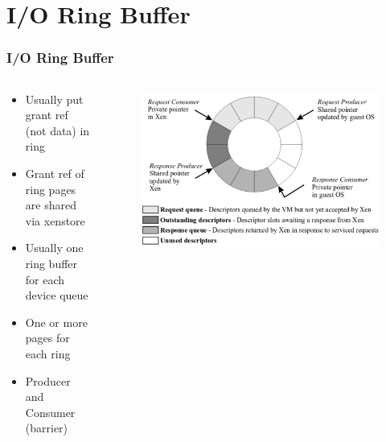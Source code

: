 \documentclass[aspectratio=169]{beamer}
\begin{document}
\section{I/O Ring Buffer}
\begin{frame}
\frametitle{I/O Ring Buffer}
\begin{columns}[c]
\begin{center}
\begin{itemize}
\item Usually put grant ref (not data) in ring
\item Grant ref of ring pages are shared via xenstore
\item Usually one ring buffer for each device queue
\item One or more pages for each ring
\item Producer and Consumer (barrier)
\end{itemize}
\end{center}
\begin{center}
\begin{figure}
\includegraphics[width=1.0\linewidth]{figures/ring.pdf}
\end{figure}
\end{center}
\end{columns}
\end{frame}

\end{document}
